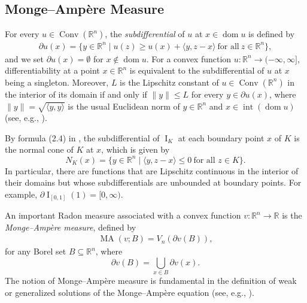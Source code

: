 \documentclass[11pt]{article}
\theoremstyle{definition} %
\newcommand{\RR}{(\mathbb{R}^n)}
\DeclareMathOperator{\Conv}{Conv}
\DeclareMathOperator{\I}{I}
\DeclareMathOperator{\dom}{dom}
\DeclareMathOperator{\interior}{int}
\DeclareMathOperator{\MA}{MA}
\begin{document}
\subsection{Monge--Ampère Measure}
For every $u\in\Conv\RR$, the \textit{subdifferential} of $u$ at $x\in \dom u$ is defined by
\begin{align*}
    \partial u(x)=\{y\in\mathbb{R}^n\mid u(z)\geq u(x)+\langle y, z-x\rangle \ \mbox{for all} \ z\in\mathbb{R}^n\},
\end{align*}
and we set $\partial u(x)=\emptyset$ for $x\not\in\dom u$.
For a convex function $u:\mathbb{R}^n\rightarrow (-\infty,\infty]$, differentiability at a point $x \in  \mathbb{R}^n$ is equivalent to  the subdifferential of $u$ at $x$ being a singleton.  Moreover,  $L$  is the Lipschitz constant of  $u\in \Conv\RR$ in the interior of its domain  if and only if $\|y\|\leq L$ for every $y\in\partial u(x)$, where $\|y\|=\sqrt{\langle y,y \rangle}$ is the usual Euclidean norm of $y\in\mathbb{R}^n$ and $x\in \interior (\dom u)$ (see, e.g., \cite[Theorem 3.61]{beck2017first}). 

By formula (2.4) in \cite{schneider2014convex}, the subdifferential of $\I_K$ at each boundary point $x$ of $K$ is the normal cone of $K$ at $x$, which is given by
$$
N_K(x) = \{ y \in \mathbb{R}^n \mid \langle y, z - x \rangle \le 0 \ \text{for all } z \in K \}.
$$
In particular, there are functions that are Lipschitz continuous in the interior of their domains but whose subdifferentials are unbounded at boundary points. For example, $\partial \I_{[0,1]}(1)=[0,\infty)$.








An important Radon measure associated with a  convex function $v:\mathbb{R}^n\rightarrow\mathbb{R}$ is the \textit{Monge--Ampère measure},  defined by
\begin{align*}
    \MA(v; B)= V_n(\partial v(B)), 
\end{align*}
for any Borel set $B \subseteq \mathbb{R}^n$, where
$$\partial v(B)= \bigcup_{x\in B}\partial v(x).$$ 
The notion of Monge--Ampère measure is fundamental in the definition of weak or generalized solutions of the Monge--Ampère  equation (see,  e.g., \cite{figalli2017monge, Trudinger-Wang-MA}). 
\end{document}
